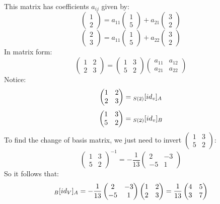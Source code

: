 \documentclass{exam}
\begin{document}
This matrix has coefficients $a_{ij}$ given by:
\[
\begin{pmatrix}
1 \\
2
\end{pmatrix}
=
a_{11}
\begin{pmatrix}
1 \\
5
\end{pmatrix}
+
a_{21}
\begin{pmatrix}
3 \\
2
\end{pmatrix}
\]
\[
\begin{pmatrix}
2 \\
3
\end{pmatrix}
=
a_{11}
\begin{pmatrix}
1 \\
5
\end{pmatrix}
+
a_{22}
\begin{pmatrix}
3 \\
2
\end{pmatrix}
\]
In matrix form:
\[
\begin{pmatrix}
1 & 2 \\
2 & 3
\end{pmatrix}
= 
\begin{pmatrix}
1 & 3 \\
5 & 2
\end{pmatrix}
\begin{pmatrix}
a_{11} & a_{12} \\
a_{21} & a_{22}
\end{pmatrix}
\]
Notice:
\[
\begin{pmatrix}
1 & 2 \\
2 & 3
\end{pmatrix}
= \cript{id_v}{S(2)}{A}
\]
\[
\begin{pmatrix}
1 & 3 \\
5 & 2
\end{pmatrix}
= \cript{id_v}{S(2)}{B}
\]
To find the change of basis matrix, we just need to invert $\begin{pmatrix}
1 & 3 \\
5 & 2
\end{pmatrix}$:
\[
\begin{pmatrix}
1 & 3 \\
5 & 2
\end{pmatrix}^{-1}
=
-\frac{1}{13}
\begin{pmatrix}
2 & -3 \\
-5 & 1
\end{pmatrix}
\]
So it follows that:
\[
\cript{id_V}{B}{A} = 
-\frac{1}{13}
\begin{pmatrix}
2 & -3 \\
-5 & 1
\end{pmatrix}
\begin{pmatrix}
1 & 2 \\
2 & 3
\end{pmatrix}
=
\frac{1}{13}
\begin{pmatrix}
4 & 5 \\
3 & 7
\end{pmatrix}
\]
\end{document}
